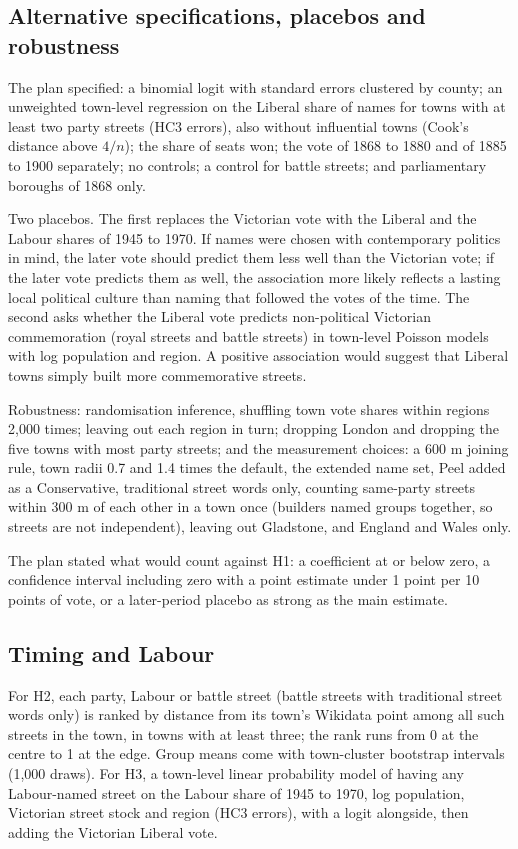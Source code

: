 \documentclass[11pt,a4paper]{article}
\begin{document}
\subsection{Alternative specifications, placebos and robustness}
The plan specified: a binomial logit with standard errors clustered by county; an unweighted town-level regression on the Liberal share of names for towns with at least two party streets (HC3 errors), also without influential towns (Cook's distance above $4/n$); the share of seats won; the vote of 1868 to 1880 and of 1885 to 1900 separately; no controls; a control for battle streets; and parliamentary boroughs of 1868 only.

Two placebos. The first replaces the Victorian vote with the Liberal and the Labour shares of 1945 to 1970. If names were chosen with contemporary politics in mind, the later vote should predict them less well than the Victorian vote; if the later vote predicts them as well, the association more likely reflects a lasting local political culture than naming that followed the votes of the time. The second asks whether the Liberal vote predicts non-political Victorian commemoration (royal streets and battle streets) in town-level Poisson models with log population and region. A positive association would suggest that Liberal towns simply built more commemorative streets.

Robustness: randomisation inference, shuffling town vote shares within regions 2,000 times; leaving out each region in turn; dropping London and dropping the five towns with most party streets; and the measurement choices: a 600 m joining rule, town radii 0.7 and 1.4 times the default, the extended name set, Peel added as a Conservative, traditional street words only, counting same-party streets within 300 m of each other in a town once (builders named groups together, so streets are not independent), leaving out Gladstone, and England and Wales only.

The plan stated what would count against H1: a coefficient at or below zero, a confidence interval including zero with a point estimate under 1 point per 10 points of vote, or a later-period placebo as strong as the main estimate.

\subsection{Timing and Labour}
For H2, each party, Labour or battle street (battle streets with traditional street words only) is ranked by distance from its town's Wikidata point among all such streets in the town, in towns with at least three; the rank runs from 0 at the centre to 1 at the edge. Group means come with town-cluster bootstrap intervals (1,000 draws). For H3, a town-level linear probability model of having any Labour-named street on the Labour share of 1945 to 1970, log population, Victorian street stock and region (HC3 errors), with a logit alongside, then adding the Victorian Liberal vote.
\end{document}
